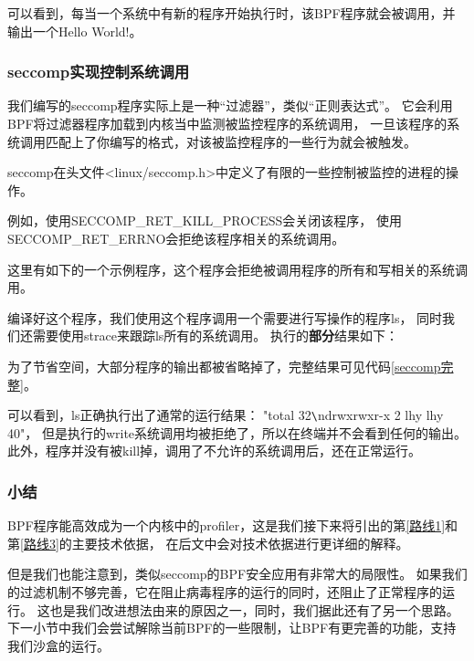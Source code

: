 \documentclass[AutoFakeBold,a4paper]{ctexart}
\begin{document}
可以看到，每当一个系统中有新的程序开始执行时，该BPF程序就会被调用，并输出一个{\ttfamily Hello World!}。

\subsubsection{seccomp实现控制系统调用}

我们编写的seccomp程序实际上是一种“过滤器”，类似“正则表达式”。
它会利用BPF将过滤器程序加载到内核当中监测被监控程序的系统调用，
一旦该程序的系统调用匹配上了你编写的格式，对该被监控程序的一些行为就会被触发。

seccomp在头文件{\ttfamily <linux/seccomp.h>}中定义了有限的一些控制被监控的进程的操作。



例如，使用{\ttfamily SECCOMP\_RET\_KILL\_PROCESS}会关闭该程序，
使用{\ttfamily SECCOMP\_RET\_ERRNO}会拒绝该程序相关的系统调用。

这里有如下的一个示例程序，这个程序会拒绝被调用程序的所有和写相关的系统调用。



编译好这个程序，我们使用这个程序调用一个需要进行写操作的程序{\ttfamily ls}，
同时我们还需要使用{\ttfamily strace}来跟踪{\ttfamily ls}所有的系统调用。
执行的\textbf{部分}结果如下：



为了节省空间，大部分程序的输出都被省略掉了，完整结果可见代码\ref{seccomp完整}。

可以看到，{\ttfamily ls}正确执行出了通常的运行结果：
{\ttfamily "total 32\verb|\|ndrwxrwxr-x 2 lhy lhy 40"}，
但是执行的{\ttfamily write}系统调用均被拒绝了，所以在终端并不会看到任何的输出。
此外，程序并没有被kill掉，调用了不允许的系统调用后，还在正常运行。

\subsubsection{小结}

BPF程序能高效成为一个内核中的profiler，这是我们接下来将引出的第\ref{路线1}和第\ref{路线3}的主要技术依据，
在后文中会对技术依据进行更详细的解释。

但是我们也能注意到，类似seccomp的BPF安全应用有非常大的局限性。
如果我们的过滤机制不够完善，它在阻止病毒程序的运行的同时，还阻止了正常程序的运行。
这也是我们改进想法由来的原因之一，同时，我们据此还有了另一个思路。
下一小节中我们会尝试解除当前BPF的一些限制，让BPF有更完善的功能，支持我们沙盒的运行。
\end{document}
